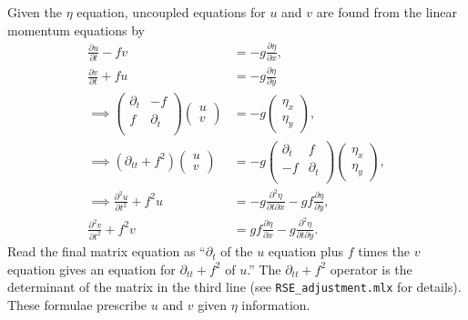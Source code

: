 \documentclass[10pt,reqno]{amsart}
\begin{document}
Given the $\eta$ equation, uncoupled equations for $u$ and $v$ are found from the linear momentum equations by 
\begin{align}
\frac{\partial u}{\partial t }  - f v &= -g \frac{\partial \eta}{\partial x} ,   \\
\frac{\partial v}{\partial t }  +f u &= -g \frac{\partial \eta}{\partial y}    \\
\implies 
\begin{pmatrix}
\partial_t & -f \\
f & \partial_t  \\
\end{pmatrix}
\begin{pmatrix}
u \\
v
\end{pmatrix} & = 
- g \begin{pmatrix}
\eta_x \\
\eta_y
\end{pmatrix}  ,   \\
\implies
\left( \partial_{tt} + f^2 \right)\begin{pmatrix}
u \\
v
\end{pmatrix} & = - g 
\begin{pmatrix}
\partial_t & f \\
-f & \partial_t  \\
\end{pmatrix}
\begin{pmatrix}
\eta_x \\
\eta_y
\end{pmatrix}   , \\
\implies
\frac{\partial^2 u}{\partial t^2} + f^2 u & = -g \frac{\partial^2 \eta}{\partial t \partial x} - g f \frac{\partial \eta}{\partial y} ,   \\
\frac{\partial^2 v}{\partial t^2} + f^2 v & = g f \frac{\partial \eta}{\partial x} - g \frac{\partial^2 \eta}{\partial t \partial y} .  
\end{align}
Read the final matrix equation as ``$\partial_t$ of the $u$ equation plus $f$ times the $v$ equation gives an equation for $\partial_{tt} + f^2$ of $u$.''
The $\partial_{tt} + f^2$ operator is the determinant of the matrix in the third line (see \texttt{RSE\_adjustment.mlx} for details).
These formulae prescribe $u$ and $v$ given $\eta$ information.
 
\end{document}
